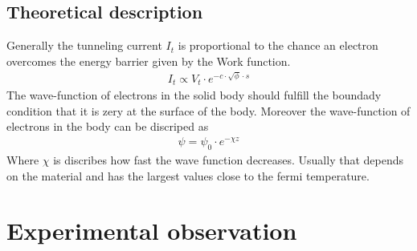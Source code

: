 \documentclass[a4paper, parskip=half]{scrartcl}
\begin{document}
\subsection{Theoretical description}
Generally the tunneling current $I_t$ is proportional to the chance an electron overcomes the energy barrier given by the Work function.
\begin{align}
I_t \propto V_t \cdot e^{-c \cdot \sqrt{\phi} \cdot s}
\end{align}
The wave-function of electrons in the solid body should fulfill the boundady condition that it is zery at the surface of the body. Moreover the wave-function of electrons in the body can be discriped as
\begin{align}
\psi = \psi_0 \cdot e^{-\chi z}
\end{align}
Where $\chi$ is discribes how fast the wave function decreases. Usually that depends on the material and has the largest values close to the fermi temperature. 
\section{Experimental observation}
    
\begin{thebibliography}{999}

\end{thebibliography}
\end{document}
